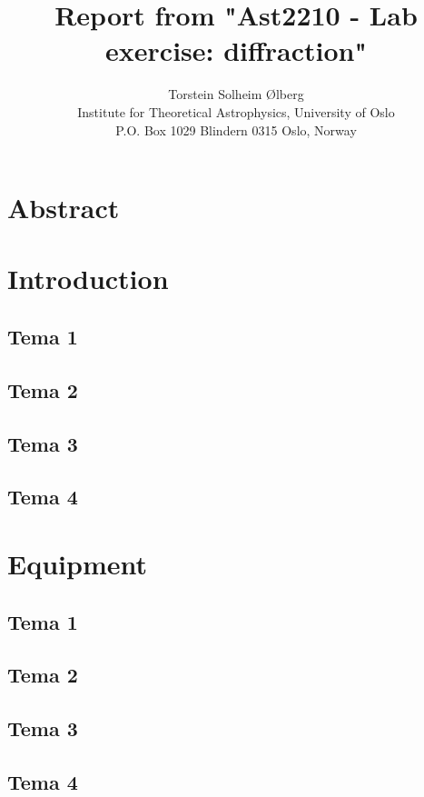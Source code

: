 \documentclass[11pt, A4paper, english]{report}
\author{Torstein Solheim Ølberg \\ Institute for Theoretical Astrophysics, University of Oslo  \\ P.O. Box 1029 Blindern 0315 Oslo, Norway}
\title{Report from "Ast2210 - Lab exercise: diffraction"}
\begin{document}
\maketitle
\tableofcontents
	\begin{multicols}{2}
		\section{Abstract}



		\section{Introduction}
			\subsection{Tema 1}


			\subsection{Tema 2}


			\subsection{Tema 3}


			\subsection{Tema 4}


		\section{Equipment}
			\subsection{Tema 1}


			\subsection{Tema 2}


			\subsection{Tema 3}


			\subsection{Tema 4}



\end{multicols}
\end{document}
